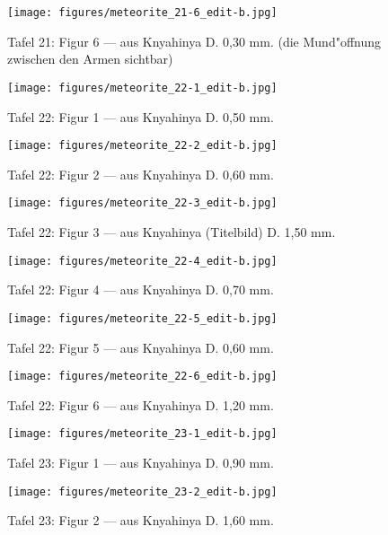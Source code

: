 \documentclass[a4paper, 11pt, oneside]{article}
\begin{document}
\clearpage
\begin{figure}[t]
\texttt{[image: figures/meteorite\_21-6\_edit-b.jpg]}
\caption{Tafel 21: Figur 6 --- aus Knyahinya D. 0,30 mm. (die Mund"offnung zwischen den Armen sichtbar)}
\centering
\end{figure}
\clearpage
{}
\begin{figure}[t]
\texttt{[image: figures/meteorite\_22-1\_edit-b.jpg]}
\caption{Tafel 22: Figur 1 --- aus Knyahinya D. 0,50 mm.}
\centering
\end{figure}
\clearpage
\begin{figure}[t]
\texttt{[image: figures/meteorite\_22-2\_edit-b.jpg]}
\caption{Tafel 22: Figur 2 --- aus Knyahinya D. 0,60 mm.}
\centering
\end{figure}
\clearpage
\begin{figure}[t]
\texttt{[image: figures/meteorite\_22-3\_edit-b.jpg]}
\caption{Tafel 22: Figur 3 --- aus Knyahinya (Titelbild) D. 1,50 mm.}
\centering
\end{figure}
\clearpage
\begin{figure}[t]
\texttt{[image: figures/meteorite\_22-4\_edit-b.jpg]}
\caption{Tafel 22: Figur 4 --- aus Knyahinya D. 0,70 mm.}
\centering
\end{figure}
\clearpage
\begin{figure}[t]
\texttt{[image: figures/meteorite\_22-5\_edit-b.jpg]}
\caption{Tafel 22: Figur 5 --- aus Knyahinya D. 0,60 mm.}
\centering
\end{figure}
\clearpage
\begin{figure}[t]
\texttt{[image: figures/meteorite\_22-6\_edit-b.jpg]}
\caption{Tafel 22: Figur 6 --- aus Knyahinya D. 1,20 mm.}
\centering
\end{figure}
\clearpage
{}
\begin{figure}[t]
\texttt{[image: figures/meteorite\_23-1\_edit-b.jpg]}
\caption{Tafel 23: Figur 1 --- aus Knyahinya D. 0,90 mm.}
\centering
\end{figure}
\clearpage
\begin{figure}[t]
\texttt{[image: figures/meteorite\_23-2\_edit-b.jpg]}
\caption{Tafel 23: Figur 2 --- aus Knyahinya D. 1,60 mm.}
\centering
\end{figure}
\end{document}
